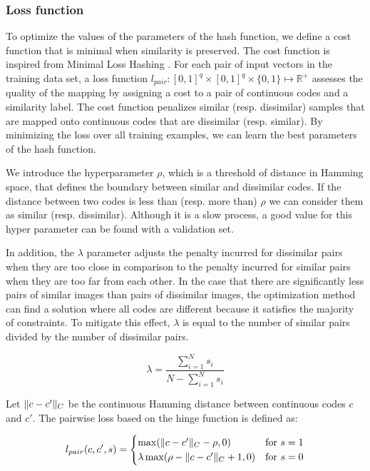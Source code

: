 \subsubsection{Loss function}
To optimize the values of the parameters of the hash function, we define a cost function that is minimal when similarity is preserved. The cost function is inspired from Minimal Loss Hashing \cite{norouzi2011minimal}. For each pair of input vectors in the training data set, a loss function $l_{pair}: [0, 1]^{q}\times[0, 1]^{q}\times\{0, 1\}\mapsto\mathbb{R}^{+}$ assesses the quality of the mapping by assigning a cost to a pair of continuous codes and a similarity label. The cost function penalizes similar (resp. dissimilar) samples that are mapped onto continuous codes that are dissimilar (resp. similar). By minimizing the loss over all training examples, we can learn the best parameters of the hash function.

We introduce the hyperparameter $\rho$, which is a threshold of distance in Hamming space, that defines the boundary between similar and dissimilar codes. If the distance between two codes is less than (resp. more than) $\rho$ we can consider them as similar (resp. dissimilar). Although it is a slow process, a good value for this hyper parameter can be found with a validation set.

In addition, the $\lambda$ parameter adjusts the penalty incurred for dissimilar pairs when they are too close in comparison to the penalty incurred for similar pairs when they are too far from each other. In the case that there are significantly less pairs of similar images than pairs of dissimilar images, the optimization method can find a solution where all codes are different because it satisfies the majority of constraints. To mitigate this effect, $\lambda$ is equal to the number of similar pairs divided by the number of dissimilar pairs.

\[\lambda = \frac{\sum\limits_{i=1}^N s_i}{N - \sum\limits_{i=1}^N s_i}\]

Let $\lVert c - c'\rVert_{C}$ be the continuous Hamming distance between continuous codes $c$ and $c'$. The pairwise loss based on the hinge function is defined as:

\[
	l_{pair}(c, c', s)=
	\begin{cases}
	\max(\lVert c - c'\rVert_{C} - \rho, 0) & \text{for } s=1 \\
	\lambda\max(\rho - \lVert c - c'\rVert_{C} + 1, 0) & \text{for } s=0
	\end{cases}
\]

